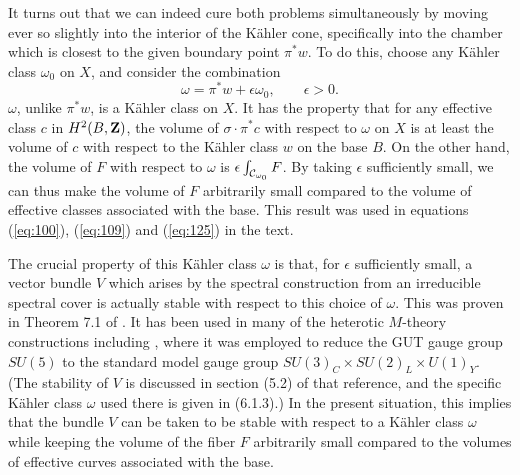 \documentclass[a4paper,12pt]{article}
\numberwithin{equation}{section}
\theoremstyle{plain}
\begin{document}
It turns out that we can indeed cure both problems simultaneously by 
moving ever so slightly into the interior of the K\"{a}hler cone, specifically 
into the chamber which is closest to the 
given boundary point ${\pi}^*w$. To do this,
choose any K\"{a}hler class $\omega_0$ on $X$, and consider the combination 
$$ \omega = {\pi}^*w + {\epsilon} \omega_0, \qquad {\epsilon} > 0. $$
$\omega$, unlike ${\pi}^*w$, is a K\"{a}hler class on $X$. 
It has the property that for any
effective class $c$ in $H^2(B,{\bf Z})$, the volume of 
${\sigma} \cdot {\pi}^*c$ with respect to $\omega$ on $X$ 
is at least the volume of $c$ with respect to the
K\"{a}hler class $w$ on the base $B$. On the other hand, the volume of $F$ 
with respect to $\omega$ is $\epsilon \int_{{\cal{C}}_{\omega_0}}{F}$. 
By taking $\epsilon$
sufficiently small, we can thus make the volume of $F$ arbitrarily small
compared to the volume of effective classes associated with the base. This result
was used in equations (\ref{eq:100}), (\ref{eq:109}) and (\ref{eq:125}) in the
text.

The crucial property of this K\"{a}hler class $\omega$ is that, for
$\epsilon$ sufficiently small, a vector bundle $V$ which arises by the spectral
construction from an irreducible spectral cover is actually stable with
respect to this choice of $\omega$. This was proven in Theorem 7.1 of
\cite{FMW2}. It has been used in many of the heterotic $M$-theory constructions 
including \cite{RD3}, where it was employed to reduce the GUT gauge 
group $SU(5)$ to the standard model gauge group $SU(3)_{C} \times SU(2)_{L} 
\times U(1)_{Y}$. (The stability 
of $V$ is discussed in section (5.2) of that reference, and the specific 
K\"{a}hler class $\omega$ used there is given in (6.1.3).) 
In the present situation, this implies that the bundle $V$ can be taken 
to be stable with respect to a K\"{a}hler class $\omega$ while keeping the volume
of the fiber $F$ arbitrarily small compared to the volumes of effective curves
associated with the base.
\end{document}
